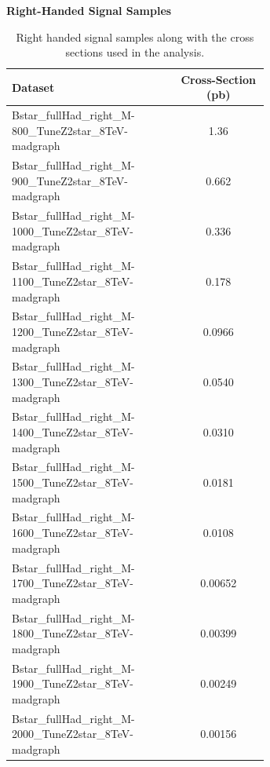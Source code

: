 \begin{table}
\begin{center}
\bf{Right-Handed Signal Samples}
\begin{tabular}{|p{0.65\linewidth}|c|}
\hline
\bf{Dataset} &  \bf{Cross-Section (pb)} \\
\hline
Bstar\_fullHad\_right\_M-800\_TuneZ2star\_8TeV-madgraph & 1.36 \\
\hline
Bstar\_fullHad\_right\_M-900\_TuneZ2star\_8TeV-madgraph & 0.662 \\
\hline
Bstar\_fullHad\_right\_M-1000\_TuneZ2star\_8TeV-madgraph & 0.336 \\ 
\hline
Bstar\_fullHad\_right\_M-1100\_TuneZ2star\_8TeV-madgraph & 0.178 \\ 
\hline
Bstar\_fullHad\_right\_M-1200\_TuneZ2star\_8TeV-madgraph & 0.0966 \\
\hline
Bstar\_fullHad\_right\_M-1300\_TuneZ2star\_8TeV-madgraph & 0.0540 \\
\hline
Bstar\_fullHad\_right\_M-1400\_TuneZ2star\_8TeV-madgraph & 0.0310 \\
\hline
Bstar\_fullHad\_right\_M-1500\_TuneZ2star\_8TeV-madgraph & 0.0181 \\
\hline
Bstar\_fullHad\_right\_M-1600\_TuneZ2star\_8TeV-madgraph & 0.0108 \\
\hline
Bstar\_fullHad\_right\_M-1700\_TuneZ2star\_8TeV-madgraph & 0.00652 \\
\hline
Bstar\_fullHad\_right\_M-1800\_TuneZ2star\_8TeV-madgraph & 0.00399 \\
\hline
Bstar\_fullHad\_right\_M-1900\_TuneZ2star\_8TeV-madgraph & 0.00249 \\
\hline
Bstar\_fullHad\_right\_M-2000\_TuneZ2star\_8TeV-madgraph & 0.00156 \\
\hline

\end{tabular}
\end{center}
\caption{Right handed signal samples along with the cross sections used in the analysis.}
\label{table:bssignalsetsright}
\end{table}

